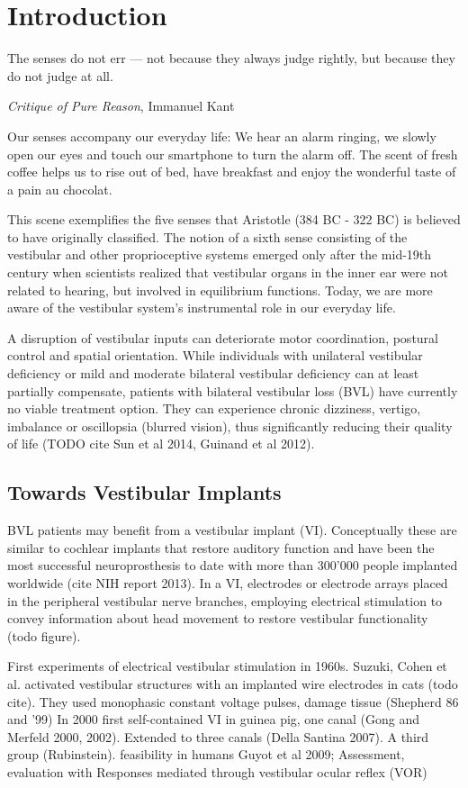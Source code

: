 \chapter{Introduction}\label{sec:introduction}
\epigraph{The senses do not err — not because they always judge rightly, but because they do not judge at all.}{\textit{Critique of Pure Reason}, Immanuel Kant}

\noindent Our senses accompany our everyday life: We hear an alarm ringing, we slowly open our eyes and touch our smartphone to turn the alarm off. The scent of fresh coffee helps us to rise out of bed, have breakfast and enjoy the wonderful taste of a pain au chocolat. 

This scene exemplifies the five senses that Aristotle (384 BC - 322 BC) is believed to have originally classified. The notion of a sixth sense consisting of the vestibular and other proprioceptive systems emerged only after the mid-19th century when scientists realized that vestibular organs in the inner ear were not related to hearing, but involved in equilibrium functions. Today, we are  more aware of the vestibular system's instrumental role in our everyday life.

A disruption of vestibular inputs can deteriorate motor coordination, postural control and spatial orientation. While individuals with unilateral vestibular deficiency or mild and moderate bilateral vestibular deficiency can at least partially compensate, patients with bilateral vestibular loss (BVL) have currently no viable treatment option. They can experience chronic dizziness, vertigo, imbalance or oscillopsia (blurred vision), thus significantly reducing their quality of life (TODO cite Sun et al 2014, Guinand et al 2012). 

\section*{Towards Vestibular Implants}
BVL patients may benefit from a vestibular implant (VI). Conceptually these are similar to cochlear implants that restore auditory function and have been the most successful neuroprosthesis to date with more than 300'000 people implanted worldwide (cite NIH report 2013). In a VI, electrodes or electrode arrays placed in the peripheral vestibular nerve branches, employing electrical stimulation to convey information about head movement to restore vestibular functionality (todo figure).

First experiments of electrical vestibular stimulation in 1960s. Suzuki, Cohen et al. activated vestibular structures with an implanted wire electrodes in cats (todo cite). They used monophasic constant voltage pulses, damage tissue (Shepherd 86 and '99) In 2000 first self-contained VI in guinea pig, one canal (Gong and Merfeld 2000, 2002). Extended to three canals (Della Santina 2007). A third group (Rubinstein). feasibility in humans Guyot et al 2009; Assessment, evaluation with Responses mediated through vestibular ocular reflex (VOR)

